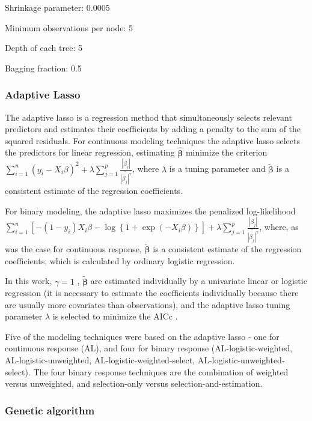 \documentclass{article}\usepackage[]{graphicx}\usepackage[]{color}
\numberwithin{equation}{section}
\numberwithin{figure}{section}
\renewcommand\[{\begin{equation}}
\renewcommand\]{\end{equation}}
\begin{document}
Shrinkage parameter: 0.0005

Minimum observations per node: 5

Depth of each tree: 5

Bagging fraction: 0.5


\subsubsection{Adaptive Lasso}

The adaptive lasso \citep{Zou-2006} is a regression method that simultaneously
selects relevant predictors and estimates their coefficients by adding
a penalty to the sum of the squared residuals. For continuous modeling
techniques the adaptive lasso selects the predictors for linear regression,
estimating $\hat{{\bm{\beta}}}$ minimize the criterion $\sum_{i=1}^{n}(y_{i}-X_{i}\beta)^{2}+\lambda\sum_{j=1}^{p}\frac{{|\beta_{j}|}}{\tilde{{|\beta_{j}|^{\gamma}}}}$,
where $\lambda$ is a tuning parameter and $\tilde{{\bm{\beta}}}$
is a consistent estimate of the regression coefficients.

For binary modeling, the adaptive lasso maximizes the penalized log-likelihood
$\sum_{i=1}^{n}\left[-\left(1-y_{i}\right)X_{i}\beta-\log\left\{ 1+\exp\left(-X_{i}\beta\right)\right\} \right]+\lambda\sum_{j=1}^{p}\frac{{|\beta_{j}|}}{\tilde{{|\beta_{j}|^{\gamma}}}}$,
where, as was the case for continuous response, $\tilde{\bm{\beta}}$
is a consistent estimate of the regression coefficients, which is
calculated by ordinary logistic regression.

In this work, $\gamma=1$ , $\tilde{{\bm{\beta}}}$ are estimated
individually by a univariate linear or logistic regression (it is
necessary to estimate the coefficients individually because there
are usually more covariates than observations), and the adaptive lasso
tuning parameter $\lambda$ is selected to minimize the AICc \citep{Hurvich-Simonoff-Tsai-1998}.

Five of the modeling techniques were based on the adaptive lasso -
one for continuous response (AL), and four for binary response (AL-logistic-weighted,
AL-logistic-unweighted, AL-logistic-weighted-select, AL-logistic-unweighted-select).
The four binary response techniques are the combination of weighted
versus unweighted, and selection-only versus selection-and-estimation.


\subsubsection{Genetic algorithm}
\end{document}
